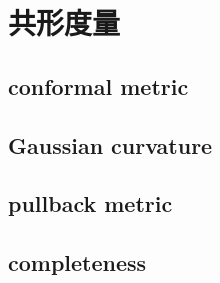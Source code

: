 \section{共形度量}
\label{b3:sec:1401}


\subsection{conformal metric}
\label{b3:subsec:140101}

\subsection{Gaussian curvature}
\label{b3:subsec:140102}

\subsection{pullback metric}
\label{b3:subsec:140103}

\subsection{completeness}
\label{b3:subsec:140104}


